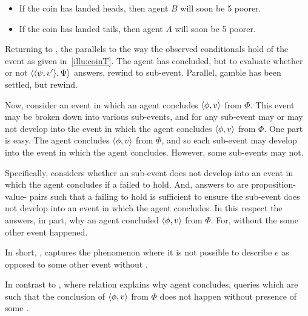 \begin{note}
  \begin{itemize}[noitemsep]
  \item
    If the coin has landed heads, then agent \(B\) will soon be \texteuro{}5 poorer.
  \item
    If the coin has landed tails, then agent \(A\) will soon be \texteuro{}5 poorer.
  \end{itemize}
\end{note}

\begin{note}
  Returning to \qWhyV{}, the \itc{} parallels to the way the observed conditionals hold of the event as given in~\autoref{illu:coinT}.
  The agent has concluded, but to evaluate whether or not \(\langle \langle \psi, v' \rangle, \Psi \rangle\) answers, rewind to sub-event.
  Parallel, gamble has been settled, but rewind.

  Now, consider an event in which an agent concludes \(\langle \phi, v \rangle\) from \(\Phi\).
  This event may be broken down into various sub-events, and for any sub-event may or may not develop into the event in which the agent concludes \(\langle \phi, v \rangle\) from \(\Phi\).
  One part is easy.
  The agent concludes \(\langle \phi, v \rangle\) from \(\Phi\), and so each sub-event may develop into the event in which the agent concludes.
  However, some sub-events may not.

  Specifically, \qWhyV{} considers whether an sub-event does not develop into an event in which the agent concludes if a \ros{} failed to hold.
  And, answers to \qWhyV{} are proposition-value-\pool{} pairs such that a \ros{} failing to hold is sufficient to ensure the sub-event does not develop into an event in which the agent concludes.
  In this respect the \ros{} answers, in part, why an agent concluded \(\langle \phi, v \rangle\) from \(\Phi\).
  For, without the \ros{} some other event happened.
\end{note}

\begin{note}
  In short, \qWhyV{}, captures the phenomenon where it is not possible to describe \(e\) as opposed to some other event without \ros{}.

  In contrast to \qWhy{}, where relation explains why agent concludes, \qWhyV{} queries which  are such that the conclusion of \(\langle \phi, v \rangle\) from \(\Phi\) does not happen without presence of some .
\end{note}

\subsection*{}

